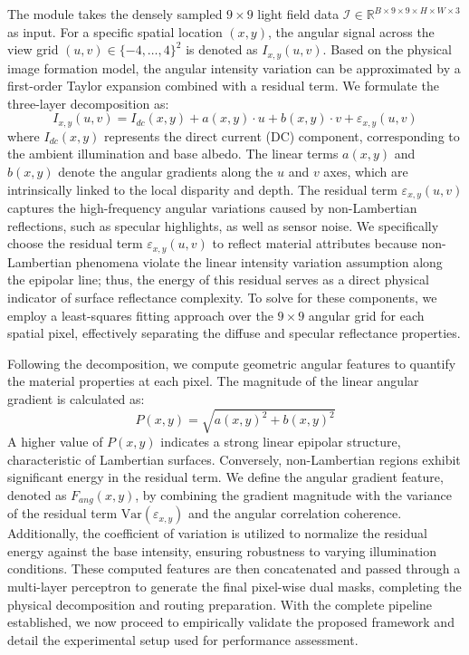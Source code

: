 The module takes the densely sampled $9 \times 9$ light field data $\mathcal{I} \in \mathbb{R}^{B \times 9 \times 9 \times H \times W \times 3}$ as input. For a specific spatial location $(x,y)$, the angular signal across the view grid $(u,v) \in \{-4, \dots, 4\}^2$ is denoted as $I_{x,y}(u,v)$. Based on the physical image formation model, the angular intensity variation can be approximated by a first-order Taylor expansion combined with a residual term. We formulate the three-layer decomposition as:
\begin{equation}
\label{eq:eq2}
I_{x,y}(u,v) = I_{dc}(x,y) + a(x,y) \cdot u + b(x,y) \cdot v + \varepsilon_{x,y}(u,v)
\end{equation}
where $I_{dc}(x,y)$ represents the direct current (DC) component, corresponding to the ambient illumination and base albedo. The linear terms $a(x,y)$ and $b(x,y)$ denote the angular gradients along the $u$ and $v$ axes, which are intrinsically linked to the local disparity and depth. The residual term $\varepsilon_{x,y}(u,v)$ captures the high-frequency angular variations caused by non-Lambertian reflections, such as specular highlights, as well as sensor noise. We specifically choose the residual term $\varepsilon_{x,y}(u,v)$ to reflect material attributes because non-Lambertian phenomena violate the linear intensity variation assumption along the epipolar line; thus, the energy of this residual serves as a direct physical indicator of surface reflectance complexity. To solve for these components, we employ a least-squares fitting approach over the $9 \times 9$ angular grid for each spatial pixel, effectively separating the diffuse and specular reflectance properties.

Following the decomposition, we compute geometric angular features to quantify the material properties at each pixel. The magnitude of the linear angular gradient is calculated as:
\begin{equation}
\label{eq:eq3}
P(x,y) = \sqrt{a(x,y)^2 + b(x,y)^2}
\end{equation}
A higher value of $P(x,y)$ indicates a strong linear epipolar structure, characteristic of Lambertian surfaces. Conversely, non-Lambertian regions exhibit significant energy in the residual term. We define the angular gradient feature, denoted as $F_{ang}(x,y)$, by combining the gradient magnitude with the variance of the residual term $\text{Var}(\varepsilon_{x,y})$ and the angular correlation coherence. Additionally, the coefficient of variation is utilized to normalize the residual energy against the base intensity, ensuring robustness to varying illumination conditions. These computed features are then concatenated and passed through a multi-layer perceptron to generate the final pixel-wise dual masks, completing the physical decomposition and routing preparation. With the complete pipeline established, we now proceed to empirically validate the proposed framework and detail the experimental setup used for performance assessment.